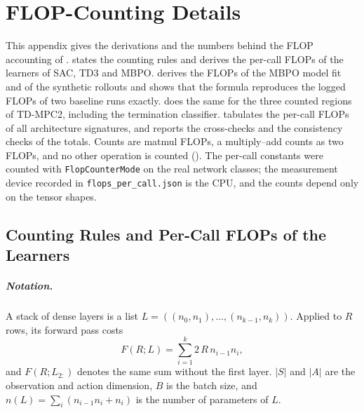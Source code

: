 \chapter{FLOP-Counting Details}
\label{app:flop-details}

This appendix gives the derivations and the numbers behind the FLOP accounting of .
 states the counting rules and derives the per-call FLOPs of the learners of SAC, TD3 and MBPO.
 derives the FLOPs of the MBPO model fit and of the synthetic rollouts and shows that the formula reproduces the logged FLOPs of two baseline runs exactly.
 does the same for the three counted regions of TD-MPC2, including the termination classifier.
 tabulates the per-call FLOPs of all architecture signatures, and  reports the cross-checks and the consistency checks of the totals.
Counts are matmul FLOPs, a multiply--add counts as two FLOPs, and no other operation is counted ().
The per-call constants were counted with \texttt{FlopCounterMode} on the real network classes; the measurement device recorded in \texttt{flops\_\allowbreak per\_\allowbreak call.json} is the CPU, and the counts depend only on the tensor shapes.

\section{Counting Rules and Per-Call FLOPs of the Learners}\label{sec:app-flop-rules}

\paragraph{Notation.} A stack of dense layers is a list $L=((n_0,n_1),\dots,(n_{k-1},n_k))$.
Applied to $R$ rows, its forward pass costs
\begin{equation}
  F(R;L) = \sum_{i=1}^{k} 2\,R\,n_{i-1}n_i ,
  \label{eq:app-fwd}
\end{equation}
and $F(R;L_{2:})$ denotes the same sum without the first layer.
$|S|$ and $|A|$ are the observation and action dimension, $B$ is the batch size, and $n(L)=\sum_i (n_{i-1}n_i+n_i)$ is the number of parameters of $L$.

